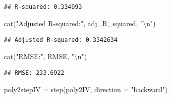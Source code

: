 \documentclass[
]{article}
\newenvironment{Shaded}{\begin{snugshade}}{\end{snugshade}}
\newcommand{\AttributeTok}[1]{\textcolor[rgb]{0.77,0.63,0.00}{#1}}
\newcommand{\FunctionTok}[1]{\textcolor[rgb]{0.00,0.00,0.00}{#1}}
\newcommand{\NormalTok}[1]{#1}
\newcommand{\OtherTok}[1]{\textcolor[rgb]{0.56,0.35,0.01}{#1}}
\newcommand{\SpecialCharTok}[1]{\textcolor[rgb]{0.00,0.00,0.00}{#1}}
\newcommand{\StringTok}[1]{\textcolor[rgb]{0.31,0.60,0.02}{#1}}
\begin{document}
\begin{verbatim}
## R-squared: 0.334993
\end{verbatim}

\begin{Shaded}
\begin{Highlighting}[]
\FunctionTok{cat}\NormalTok{(}\StringTok{"Adjusted R{-}squared:"}\NormalTok{, adj\_R\_squared, }\StringTok{"}\SpecialCharTok{\textbackslash{}n}\StringTok{"}\NormalTok{)}
\end{Highlighting}
\end{Shaded}

\begin{verbatim}
## Adjusted R-squared: 0.3342634
\end{verbatim}

\begin{Shaded}
\begin{Highlighting}[]
\FunctionTok{cat}\NormalTok{(}\StringTok{"RMSE:"}\NormalTok{, RMSE, }\StringTok{"}\SpecialCharTok{\textbackslash{}n}\StringTok{"}\NormalTok{)}
\end{Highlighting}
\end{Shaded}

\begin{verbatim}
## RMSE: 233.6922
\end{verbatim}

\begin{Shaded}
\begin{Highlighting}[]
\NormalTok{poly2stepIV }\OtherTok{=} \FunctionTok{step}\NormalTok{(poly2IV, }\AttributeTok{direction =} \StringTok{"backward"}\NormalTok{)}
\end{Highlighting}
\end{Shaded}
\end{document}
